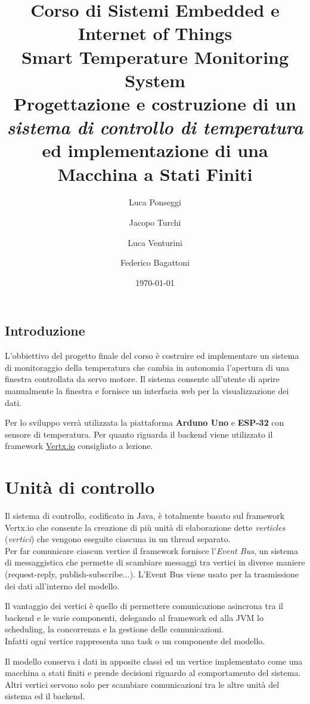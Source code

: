 \documentclass{report}
\title{
\normalsize{Corso di Sistemi Embedded e Internet of Things}\\
\Huge{Smart Temperature Monitoring System}\\
\vspace{0.75em}
\large{Progettazione e costruzione di un \textit{sistema di controllo di temperatura} ed implementazione di una Macchina a Stati Finiti}
}
\author{Luca Ponseggi \and Jacopo Turchi \and Luca Venturini \and Federico Bagattoni}
\date{\today}
\begin{document}
\maketitle

\tableofcontents
\newpage
\section*{Introduzione}
\par{
L'obbiettivo del progetto finale del corso è costruire ed implementare un sistema di monitoraggio della temperatura che cambia in autonomia l'apertura di una finestra controllata da servo motore. Il sistema consente all'utente di aprire manualmente la finestra e fornisce un interfacia web per la visualizzazione dei dati.
}
\par{
Per lo sviluppo verrà utilizzata la piattaforma \textbf{Arduno Uno} e \textbf{ESP-32} con sensore di temperatura. Per quanto riguarda il backend viene utilizzato il framework \href{https://vertx.io/}{Vertx.io} consigliato a lezione.
}

\chapter{Unità di controllo}
\par {
Il sistema di controllo, codificato in Java, è totalmente basato sul framework Vertx.io che consente la creazione di più unità di elaborazione dette \textit{verticles} (\textit{vertici}) che vengono eseguite ciascuna in un thread separato. \\
Per far comunicare ciascun vertice il framework fornisce l'\textit{Event Bus}, un sistema di messaggistica che permette di scambiare messaggi tra vertici in diverse maniere (request-reply, publish-subscribe...). L'Event Bus viene usato per la trasmissione dei dati all'interno del modello. 
}
\par {
Il vantaggio dei vertici è quello di permettere comunicazione asincrona tra il backend e le varie componenti, delegando al framework ed alla JVM lo scheduling, la concorrenza e la gestione delle comunicazioni. \\
Infatti ogni vertice rappresenta una task o un componente del modello.
}
\par {
Il modello conserva i dati in apposite classi ed un vertice implementato come una macchina a stati finiti e prende decisioni riguardo al comportamento del sistema. Altri vertici servono solo per scambiare comunicazioni tra le altre unità del sistema ed il backend.
}
\end{document}
